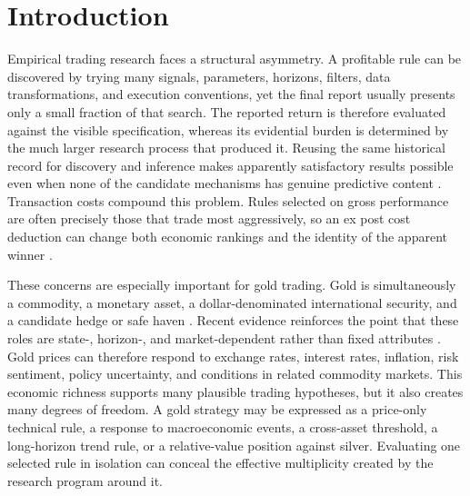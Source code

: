 \section{Introduction}\label{sec:introduction}

Empirical trading research faces a structural asymmetry. A profitable rule can be discovered by trying many signals, parameters, horizons, filters, data transformations, and execution conventions, yet the final report usually presents only a small fraction of that search. The reported return is therefore evaluated against the visible specification, whereas its evidential burden is determined by the much larger research process that produced it. Reusing the same historical record for discovery and inference makes apparently satisfactory results possible even when none of the candidate mechanisms has genuine predictive content \citep{white2000,sullivan1999}. Transaction costs compound this problem. Rules selected on gross performance are often precisely those that trade most aggressively, so an ex post cost deduction can change both economic rankings and the identity of the apparent winner \citep{bajgrowicz2012}.

These concerns are especially important for gold trading. Gold is simultaneously a commodity, a monetary asset, a dollar-denominated international security, and a candidate hedge or safe haven \citep{baur2010hedge,baur2010safe}. Recent evidence reinforces the point that these roles are state-, horizon-, and market-dependent rather than fixed attributes \citep{gurdgiev2024,ryan2024,faraj2025,xu2026}. Gold prices can therefore respond to exchange rates, interest rates, inflation, risk sentiment, policy uncertainty, and conditions in related commodity markets. This economic richness supports many plausible trading hypotheses, but it also creates many degrees of freedom. A gold strategy may be expressed as a price-only technical rule, a response to macroeconomic events, a cross-asset threshold, a long-horizon trend rule, or a relative-value position against silver. Evaluating one selected rule in isolation can conceal the effective multiplicity created by the research program around it.


